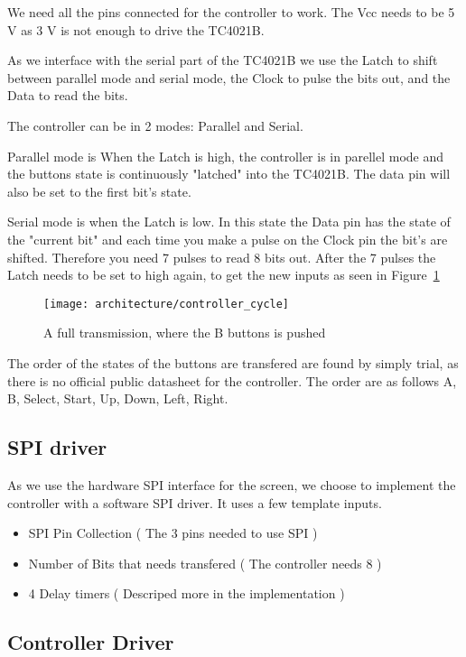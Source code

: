 We need all the pins connected for the controller to work. The Vcc needs to be 5 V as 3 V is not enough to drive the TC4021B.

As we interface with the serial part of the TC4021B we use the Latch to shift between parallel mode and serial mode, the Clock to pulse the bits out, and the Data to read the bits.

The controller can be in 2 modes: Parallel and Serial.

Parallel mode is When the Latch is high, the controller is in parellel mode and the buttons state is continuously "latched" into the TC4021B. The data pin will also be set to the first bit's state.

Serial mode is when the Latch is low. In this state the Data pin has the state of the "current bit" and each time you make a pulse on the Clock pin the bit's are shifted. Therefore you need 7 pulses to read 8 bits out. After the 7 pulses the Latch needs to be set to high again, to get the new inputs as seen in Figure~\ref{fig:controller_cycle}

\begin{figure}
\centering
\texttt{[image: architecture/controller\_cycle]}
\caption{A full transmission, where the B buttons is pushed}
\label{fig:controller_cycle}
\end{figure}

The order of the states of the buttons are transfered are found by simply trial, as there is no official public datasheet for the controller. The order are as follows A, B, Select, Start, Up, Down, Left, Right.

\subsection{SPI driver}

As we use the hardware SPI interface for the screen, we choose to implement the controller with a software SPI driver. It uses a few template inputs.

\begin{itemize}
\item SPI Pin Collection ( The 3 pins needed to use SPI )
\item Number of Bits that needs transfered ( The controller needs 8 )
\item 4 Delay timers ( Descriped more in the implementation )
\end{itemize}


\subsection{Controller Driver}

